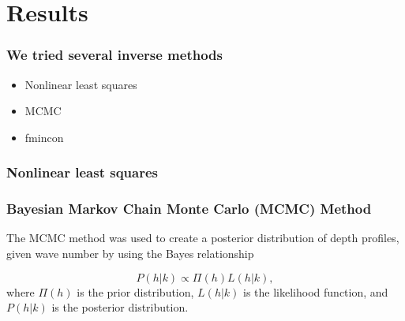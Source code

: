 \documentclass[7pt]{beamer}
\begin{document}
\section{Results}

\begin{frame}
 \frametitle{We tried several inverse methods}
\begin{itemize}
\item Nonlinear least squares
\item MCMC
\item fmincon
\end{itemize}
\end{frame}


 \begin{frame}
\frametitle{Nonlinear least squares}


\end{frame}



 \begin{frame}
\frametitle{Bayesian Markov Chain Monte Carlo (MCMC) Method}
The MCMC method was used to create a posterior distribution of depth profiles, given wave number by using the Bayes relationship

\begin{equation}\label{bayes}
P(h|%
k) \propto \Pi(h)L(h|%
k),
\end{equation} 
where $\Pi(h)$ is the prior distribution, $L(h|%
k)$ is the likelihood function, and $P(h|%
k)$ is the posterior distribution.
\end{frame}
\end{document}
